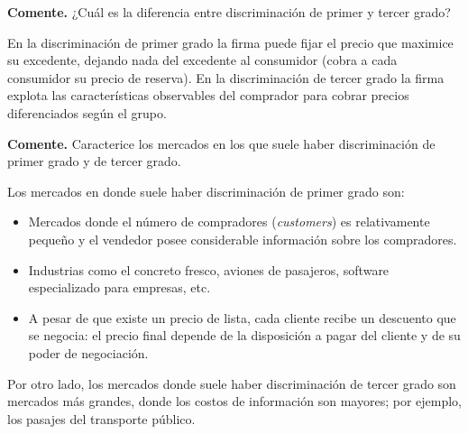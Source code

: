 \question \textbf{Comente.} ¿Cuál es la diferencia entre discriminación de primer y tercer grado?
\begin{solution}
En la discriminación de primer grado la firma puede fijar el precio que maximice su excedente, dejando nada del excedente al consumidor (cobra a cada consumidor su precio de reserva). En la discriminación de tercer grado la firma explota las características observables del comprador para cobrar precios diferenciados según el grupo.

\end{solution}

\question \textbf{Comente.} Caracterice los mercados en los que suele haber discriminación de primer grado y de tercer grado.
\begin{solution}
Los mercados en donde suele haber discriminación de primer grado son:
\begin{itemize}
  \item Mercados donde el número de compradores (\emph{customers}) es relativamente pequeño y el vendedor posee considerable información sobre los compradores.
  \item Industrias como el concreto fresco, aviones de pasajeros, software especializado para empresas, etc.
  \item A pesar de que existe un precio de lista, cada cliente recibe un descuento que se negocia: el precio final depende de la disposición a pagar del cliente y de su poder de negociación.
\end{itemize}
Por otro lado, los mercados donde suele haber discriminación de tercer grado son mercados más grandes, donde los costos de información son mayores; por ejemplo, los pasajes del transporte público.

\end{solution}

